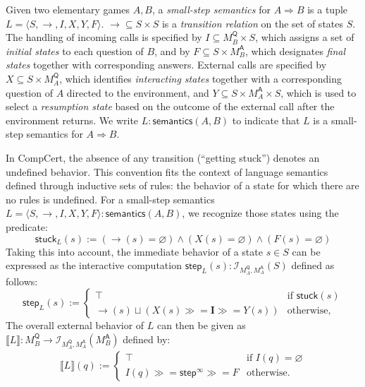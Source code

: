 \documentclass[acmsmall,timestamp,review,anonymous]{acmart}
\newcommand{\kw}[1]{\ensuremath{ \mathsf{#1} }}
\newcommand{\bind}{\gg\!\!=}
\begin{document}
\begin{definition}
Given two elementary games $A, B$,
a \emph{small-step semantics} for $A \Rightarrow B$
is a tuple $L = \langle S, \rightarrow, I, X, Y, F \rangle$.
${\rightarrow} \subseteq S \times S$ is a \emph{transition relation} on
the set of states $S$.
The handling of incoming calls is specified by
$I \subseteq M_B^\kw{Q} \times S$, which
assigns a set of \emph{initial states} to each question of $B$, and by
$F \subseteq S \times M_B^\kw{A}$,
which designates \emph{final states} together with corresponding answers.
External calls are specified by
$X \subseteq S \times M_A^\kw{Q}$,
which identifies \emph{interacting states} together with
a corresponding question of $A$ directed to the environment, and
$Y \subseteq S \times M_A^\kw{A} \times S$,
which is used to select a \emph{resumption state}
based on the outcome of the external call
after the environment returns.
We write $L : \kw{semantics}(A, B)$ to indicate that
$L$ is a small-step semantics for $A \Rightarrow B$.
\end{definition}

In CompCert, the absence of any transition (``getting stuck'')
denotes an undefined behavior.
This convention fits the context of
language semantics defined through inductive sets of rules:
the behavior of a state for which there are no rules is undefined.
For a small-step semantics
$L = \langle S, {\rightarrow}, I, X, Y, F \rangle : \kw{semantics}(A,B)$,
we recognize those states using the predicate:
\[
    \kw{stuck}_L(s) :=
      ({\rightarrow}(s) = \varnothing) \wedge
      (X(s) = \varnothing) \wedge
      (F(s) = \varnothing)
\]
Taking this into account,
the immediate behavior of a state $s \in S$
can be expressed as the interactive computation
$\kw{step}_L(s) : \mathcal{I}_{M_A^\kw{Q},M_A^\kw{A}}(S)$
defined as follows:
\[
  \kw{step}_L(s) :=
    \begin{cases}
      \top & \mbox{if } \kw{stuck}(s) \\
      {\rightarrow}(s) \sqcup
      (X(s) \bind \mathbf{I} \bind Y(s)) & \mbox{otherwise,}
   \end{cases}
\]
The overall external behavior of $L$
can then be given as
$
    \llbracket L \rrbracket :
      M_B^\kw{Q} \rightarrow \mathcal{I}_{M_A^\kw{Q},M_A^\kw{A}}(M_B^\kw{A})
$
defined by:
\begin{align*}
  \llbracket L \rrbracket (q) :=
    \begin{cases}
       \top & \mbox{if } I(q) = \varnothing \\
       I(q) \bind \kw{step}^\infty \bind F & \mbox{otherwise.}
     \end{cases}
\end{align*}
\end{document}
